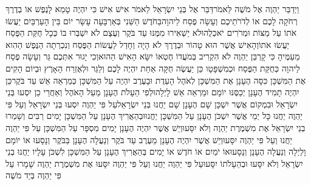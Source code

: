 \documentclass[../main/main.tex]{subfiles}
\begin{document}
\begin{multicols}{\ncols}
וַיְדַבֵּר יַהְוֶה אֶל מֹשֶׁה לֵּאמֹר\PreVerseSpace{}דַּבֵּר אֶל בְּנֵי יִשְׂרָאֵל לֵאמֹר אִישׁ אִישׁ כִּי יִהְיֶה טָמֵא לָנֶפֶשׁ אוֹ בְדֶרֶךְ רְחֹקָה לָכֶם אוֹ לְדֹרֹתֵיכֶם וְעָשָׂה פֶסַח לַיהוָה\PreVerseSpace{}בַּחֹדֶשׁ הַשֵּׁנִי בְּאַרְבָּעָה עָשָׂר יוֹם בֵּין הָעַרְבַּיִם יַעֲשׂוּ אֹתוֹ עַל מַצּוֹת וּמְרֹרִים יֹאכְלֻהוּ\PreVerseSpace{}לֹא יַשְׁאִירוּ מִמֶּנּוּ עַד בֹּקֶר וְעֶצֶם לֹא יִשְׁבְּרוּ בוֹ כְּכָל חֻקַּת הַפֶּסַח יַעֲשׂוּ אֹתוֹ\PreVerseSpace{}וְהָאִישׁ אֲשֶׁר הוּא טָהוֹר וּבְדֶרֶךְ לֹא הָיָה וְחָדַל לַעֲשׂוֹת הַפֶּסַח וְנִכְרְתָה הַנֶּפֶשׁ הַהִוא מֵעַמֶּיהָ כִּי קָרְבַּן יַהְוֶה לֹא הִקְרִיב בְּמֹעֲדוֹ חֶטְאוֹ יִשָּׂא הָאִישׁ הַהוּא\PreVerseSpace{}וְכִי יָגוּר אִתְּכֶם גֵּר וְעָשָׂה פֶסַח לַיהוָה כְּחֻקַּת הַפֶּסַח וּכְמִשְׁפָּטָו\SubEnd{} כֵּן יַעֲשֶׂה חֻקָּה אַחַת יִהְיֶה לָכֶם וְלַגֵּר וּלְאֶזְרַח הָאָרֶץ \ClosedSection{}וּבְיוֹם הָקִים אֶת הַמִּשְׁכָּן כִּסָּה הֶעָנָן אֶת הַמִּשְׁכָּן לְאֹהֶל הָעֵדֻת וּבָעֶרֶב יִהְיֶה עַל הַמִּשְׁכָּן כְּמַרְאֵה אֵשׁ עַד בֹּקֶר\PreVerseSpace{}כֵּן יִהְיֶה תָמִיד הֶעָנָן יְכַסֶּנּוּ יוֹמָם\OmitEnd{} וּמַרְאֵה אֵשׁ לָיְלָה\PreVerseSpace{}וּלְפִי הֵעָלֹת הֶעָנָן מֵעַל הָאֹהֶל וְאַחֲרֵי כֵן יִסְעוּ בְּנֵי יִשְׂרָאֵל וּבִמְקוֹם אֲשֶׁר יִשְׁכָּן שָׁם הֶעָנָן שָׁם יַחֲנוּ בְּנֵי יִשְׂרָאֵל\PreVerseSpace{}עַל פִּי יַהְוֶה יִסְעוּ בְּנֵי יִשְׂרָאֵל וְעַל פִּי יַהְוֶה יַחֲנוּ כָּל יְמֵי אֲשֶׁר יִשְׁכֹּן הֶעָנָן עַל הַמִּשְׁכָּן יַחֲנוּ\PreVerseSpace{}וּבְהַאֲרִיךְ הֶעָנָן עַל הַמִּשְׁכָּן יָמִים רַבִּים וְשָׁמְרוּ בְנֵי יִשְׂרָאֵל אֶת מִשְׁמֶרֶת יַהְוֶה וְלֹא יִסָּעוּ\PreVerseSpace{}וְיֵשׁ אֲשֶׁר יִהְיֶה הֶעָנָן יָמִים מִסְפָּר עַל הַמִּשְׁכָּן עַל פִּי יַהְוֶה יַחֲנוּ וְעַל פִּי יַהְוֶה יִסָּעוּ\PreVerseSpace{}וְיֵשׁ אֲשֶׁר יִהְיֶה הֶעָנָן מֵעֶרֶב עַד בֹּקֶר וְנַעֲלָה הֶעָנָן בַּבֹּקֶר וְנָסָעוּ אוֹ יוֹמָם וָלַיְלָה וְנַעֲלָה הֶעָנָן וְנָסָעוּ\PreVerseSpace{}אוֹ יֹמַיִם אוֹ חֹדֶשׁ אוֹ יָמִים בְּהַאֲרִיךְ הֶעָנָן עַל הַמִּשְׁכָּן לִשְׁכֹּן עָלָיו יַחֲנוּ בְנֵי יִשְׂרָאֵל וְלֹא יִסָּעוּ וּבְהֵעָלֹתוֹ יִסָּעוּ\PreVerseSpace{}עַל פִּי יַהְוֶה יַחֲנוּ וְעַל פִּי יַהְוֶה יִסָּעוּ אֶת מִשְׁמֶרֶת יַהְוֶה שָׁמָרוּ עַל פִּי יַהְוֶה בְּיַד מֹשֶׁה\OpenSection{}\par

\end{multicols}
\end{document}
